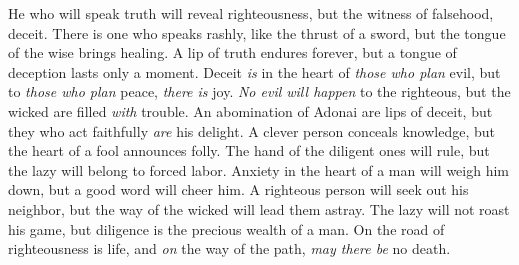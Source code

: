 \begin{biblechapter}
\verse He who will speak truth will reveal righteousness, 
but the witness of falsehood, deceit.
\verse There is one who speaks rashly, like the thrust of a sword, 
but the tongue of the wise brings healing.
\verse A lip of truth endures forever, 
but a tongue of deception lasts only a moment.
\verse Deceit \textit{is} in the heart of \textit{those who plan} evil, 
but to \textit{those who plan} peace, \textit{there is} joy.
\verse \textit{No evil will happen} to the righteous, 
but the wicked are filled \textit{with} trouble.
\verse An abomination of Adonai are lips of deceit, 
but they who act faithfully \textit{are} his delight.
\verse A clever person conceals knowledge, 
but the heart of a fool announces folly.
\verse The hand of the diligent ones will rule, 
but the lazy will belong to forced labor.
\verse Anxiety in the heart of a man will weigh him down, 
but a good word will cheer him.
\verse A righteous person will seek out his neighbor, 
but the way of the wicked will lead them astray.
\verse The lazy will not roast his game, 
but diligence is the precious wealth of a man.
\verse On the road of righteousness is life, 
and \textit{on} the way of the path, \textit{may there be} no death.
\end{biblechapter}

